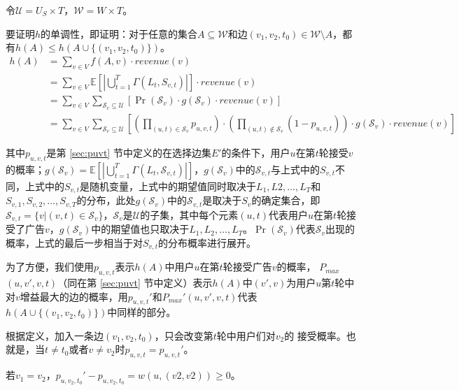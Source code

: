 令$\mathcal{U}=U_S \times T$，$\mathcal{W}=W \times T$。

要证明$h$的单调性，即证明：对于任意的集合$A \subseteq \mathcal{W}$和边$(v_1,v_2,t_0) \in \mathcal{W}\setminus A$，都有$h(A)\le h(A\cup\{(v_1,v_2,t_0)\})$。
\begin{align}
    h(A)&=\sum_{v \in V} f(A,v)\cdot revenue(v) \\ 
    &=\sum_{v \in V} \mathbb{E}\left[\left|\bigcup_{t=1}^{T}\Gamma(L_t,S_{v,t})\right|\right]\cdot revenue(v) \\
    &= \sum_{v\in V} \sum_{\mathcal{S}_v \subseteq \mathcal{U}} \left[\Pr(\mathcal{S}_v)\cdot g(\mathcal{S}_v)\cdot revenue(v)\right]\\ 
    &=\sum_{v\in V}\sum_{\mathcal{S}_v \subseteq \mathcal{U}}\left[\left(\prod_{(u,t)\in \mathcal{S}_v}p_{u,v,t}\right)\cdot \left(\prod_{(u,t) \notin \mathcal{S}_v} (1-p_{u,v,t})\right) \cdot g(\mathcal{S}_v)\cdot revenue(v)\right]     
\end{align}

\noindent 其中$p_{u,v,t}$是第 \ref{sec:puvt} 节中定义的在选择边集$E'$的条件下，用户$u$在第$t$轮接受$v$的概率；$g(\mathcal{S}_v)=\mathbb{E}\left[\left|\bigcup_{t=1}^{T}\Gamma(L_t,\mathcal{S}_{v,t})\right|\right] $，$g(\mathcal{S}_v)$中的$\mathcal{S}_{v,t}$与上式中的$S_{v,t}$不同，上式中的$S_{v,t}$是随机变量，上式中的期望值同时取决于$L_1,L2,\ldots,L_T$和$S_{v,1},S_{v,2},\ldots,S_{v,T}$的分布，此处$g(\mathcal{S}_v)$中的$\mathcal{S}_{v,t}$是取决于$S_v$的确定集合，即$\mathcal{S}_{v,t}=\{v|(v,t)\in \mathcal{S}_v\}$，$\mathcal{S}_v$是$\mathcal{U}$的子集，其中每个元素$(u,t)$代表用户$u$在第$t$轮接受了广告$v$，$g(\mathcal{S}_v)$中的期望值也只取决于$L_1,L_2,\ldots,L_T$。$\Pr(\mathcal{S}_v)$代表$\mathcal{S}_v$出现的概率，上式的最后一步相当于对$S_{v,t}$的分布概率进行展开。

为了方便，我们使用$p_{u,v,t}$表示$h(A)$中用户$u$在第$t$轮接受广告$v$的概率， $P_{max}$ $(u,v',v,t)$（同在第 \ref{sec:puvt} 节中定义）表示$h(A)$中$(v',v)$为用户$u$第$t$轮中对$v$增益最大的边的概率，用$p_{u,v,t}'$和$P_{max}'(u,v',v,t)$代表$h(A\cup\{(v_1,v_2,t_0)\})$中同样的部分。

根据定义，加入一条边$(v_1,v_2,t_0)$，只会改变第$t$轮中用户们对$v_2$的 接受概率。也就是，当$t\ne t_0$或者$v \ne v_2$时$p_{u,v,t}=p_{u,v,t}'$。

若$v_1 = v_2$，$p_{u,v_2,t_0}'-p_{u,v_2,t_0}=w(u,(v2,v2)) \ge 0$。


